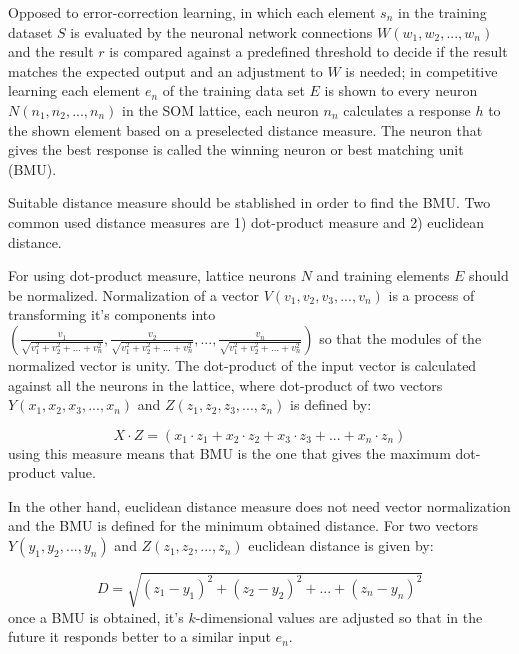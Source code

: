\documentclass{article}
\begin{document}
Opposed to error-correction learning, in which each element $s_n$ in the training dataset $S$ is evaluated by the neuronal network connections $W(w_1, w_2,...,w_n)$ and the result $r$ is compared against a predefined threshold to decide if the result matches the expected output and an adjustment to $W$ is needed; in competitive learning each element $e_n$ of the training data set $E$ is shown to every neuron $N(n_1,n_2,...,n_n)$ in the SOM lattice, each neuron $n_n$ calculates a response $h$ to the shown element based on a preselected distance measure. The neuron that gives the best response is called the winning neuron or best matching unit (BMU).

Suitable distance measure should be stablished in order to find the BMU. Two common used distance measures are 1) dot-product measure and 2) euclidean distance.

For using dot-product measure, lattice neurons $N$ and training elements $E$ should be normalized. Normalization of a vector $V(v_1, v_2, v_3,...,v_n)$ is a process of transforming it's components into
$(\frac{v_1}{\sqrt{v_1^2+v_2^2+...+v_n^2}},
\frac{v_2}{\sqrt{v_1^2+v_2^2+...+v_n^2}},
...,
\frac{v_n}{\sqrt{v_1^2+v_2^2+...+v_n^2}}
)$
 so that the modules of the normalized vector is unity. The dot-product of the input vector is calculated against all the neurons in the lattice, where dot-product of two vectors $Y(x_1, x_2, x_3,..., x_n)$ and $Z(z_1, z_2, z_3,..., z_n)$ is defined by: 
  
\begin{equation}
X \cdot Z = (x_1 \cdot z_1 + x_2 \cdot z_2 + x_3 \cdot z_3 + ... + x_n \cdot z_n)
\end{equation}
using this measure means that BMU is the one that gives the maximum dot-product value.
 
 In the other hand, euclidean distance measure does not need vector normalization and the BMU is defined for the minimum obtained distance. For two vectors $Y(y_1,y_2,...,y_n)$ and $Z(z_1,z_2,...,z_n)$ euclidean distance is given by:
 
\begin{equation}
D = \sqrt{(z_1-y_1)^2 + (z_2-y_2)^2 + ... + (z_n-y_n)^2}
\end{equation}
once a BMU is obtained, it's $k$-dimensional values are adjusted so that in the future it responds better to a similar input $e_n$.
\end{document}
